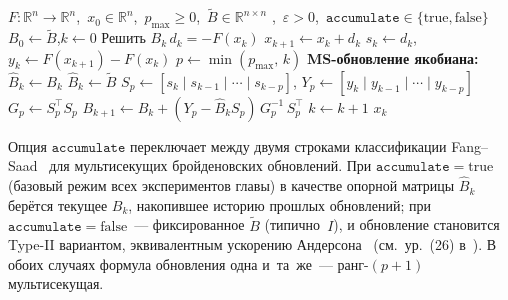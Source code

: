 \begin{breakablealgorithm}
\caption{Мультисекущий Бройден
         $(F,\,x_0,\,p_{\max},\,\widetilde{B},\,\varepsilon,\,\mathtt{accumulate})$}
\label{alg:sp_broyden}
\begin{algorithmic}
\Require $F\colon \mathbb{R}^n \to \mathbb{R}^n$,\ $x_0 \in \mathbb{R}^n$,\
         $p_{\max} \geq 0$,\
         $\widetilde{B} \in \mathbb{R}^{n \times n}$
         ,\
         $\varepsilon > 0$,\
         $\mathtt{accumulate} \in \{\text{true},\text{false}\}$
\State $B_0 \leftarrow \widetilde{B}$,\quad $k \leftarrow 0$
\While{$\|F(x_k)\| \geq \varepsilon$}
  \State Решить $B_k\,d_k = -F(x_k)$
  \State $x_{k+1} \leftarrow x_k + d_k$
  \State $s_k \leftarrow d_k$,\quad $y_k \leftarrow F(x_{k+1}) - F(x_k)$
  \State $p \leftarrow \min(p_{\max},\,k)$
  \State \textbf{MS-обновление якобиана:}
  \If{$\mathtt{accumulate}$}
    \State $\widehat{B}_k \leftarrow B_k$
  \Else
    \State $\widehat{B}_k \leftarrow \widetilde{B}$
  \EndIf
  \State $S_p \leftarrow [s_k \mid s_{k-1} \mid \cdots \mid s_{k-p}]$,\quad
         $Y_p \leftarrow [y_k \mid y_{k-1} \mid \cdots \mid y_{k-p}]$
  \State $G_p \leftarrow S_p^\top S_p$
       \hfill{}
  \State $B_{k+1} \leftarrow \widehat{B}_k +
    (Y_p - \widehat{B}_k S_p)\,G_p^{-1}\,S_p^\top$
       \hfill{}
  \State $k \leftarrow k + 1$
\EndWhile
\Return $x_k$
\end{algorithmic}
\end{breakablealgorithm}

\begin{remark}\label{rem:taxonomy}
Опция $\mathtt{accumulate}$ переключает между двумя строками
классификации Fang--Saad~\cite{fang2009} для мультисекущих
бройденовских обновлений. При $\mathtt{accumulate}=\text{true}$
(базовый режим всех экспериментов главы) в качестве опорной матрицы
$\widehat B_k$ берётся текущее $B_k$, накопившее историю прошлых
обновлений; при $\mathtt{accumulate}=\text{false}$~--- фиксированное
$\widetilde B$ (типично~$I$), и обновление становится Type-II
вариантом, эквивалентным ускорению Андерсона~\cite{anderson1965}
(см.\ ур.~(26) в~\cite{fang2009}). В обоих случаях формула
обновления одна и~та~же~--- ранг-$(p{+}1)$ мультисекущая.
\end{remark}

